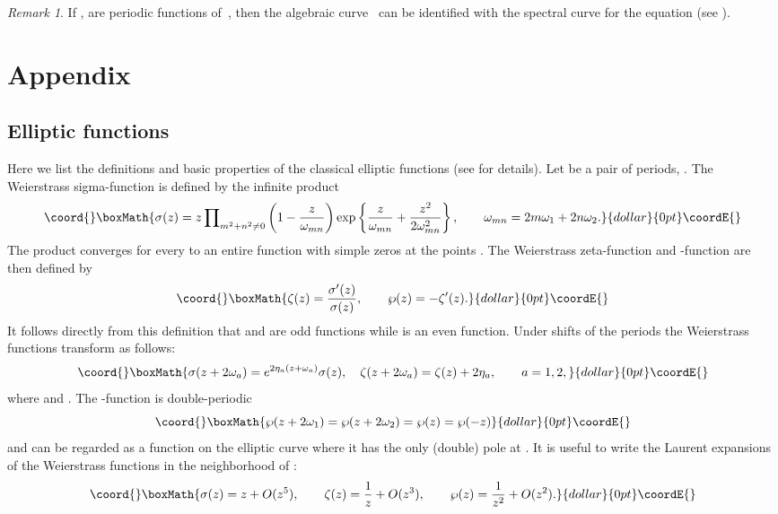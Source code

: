 \documentclass[a4paper,11pt]{article}
\providecommand{\p}{\partial}
\providecommand{\comp}{\mathbb C}
\providecommand{\inte}{\mathbb Z}
\providecommand{\vS}{\Vec{S}}
\theoremstyle{plain}
\theoremstyle{remark}
\newtheorem*{rem}{Remark}
\begin{document}
\begin{rem}
If \coordHE{}, \coordHE{} are periodic functions of~\coordHE{},
then the algebraic curve~\myHighlight{$\Gamma$}\coordHE{} can be identified with the spectral
curve for the equation \myHighlight{$(\p_x- L)\vS=0$}\coordHE{} (see \cite{krvb}).
\end{rem}

\appendix
\section{Appendix}
\subsection{Elliptic functions}

Here we list the definitions and basic properties of the classical
elliptic functions (see \cite{bat} for details).
Let \myHighlight{$2\omega_1,2\omega_2\in\comp$}\coordHE{}
be a pair of periods, \coordHE{}.
The Weierstrass sigma-function is defined by the infinite product
$$\coord{}\boxMath{
\sigma(z)= z \prod\nolimits_{m^2+n^2\ne 0} \left( 1-\frac{z}{\omega_{m n}}
\right)
\exp\left\{ \frac{z}{\omega_{m n}}+\frac{z^2}{2 \omega^2_{m n}} \right\},
\qquad
\omega_{m n}=2m \omega_1+2n \omega_2 .
}{dollar}{0pt}\coordE{}$$
The product converges for every \coordHE{} to an entire function with simple
zeros at the points \coordHE{}.
The Weierstrass zeta-function and \myHighlight{$\wp$}\coordHE{}-function are then defined by
$$\coord{}\boxMath{
\zeta(z)=\frac{\sigma'(z)}{\sigma(z)},\qquad
\wp(z)=-\zeta'(z) .
}{dollar}{0pt}\coordE{}$$
It follows directly from this definition that \coordHE{} and \coordHE{}
are odd functions while \coordHE{} is an even function. Under shifts
of the periods the Weierstrass functions transform as follows:
$$\coord{}\boxMath{
\sigma(z+2\omega_a)=e^{2\eta_a(z+\omega_a)}\sigma(z),\quad
\zeta(z+2\omega_a)=\zeta(z)+2\eta_a,\qquad a=1,2,
}{dollar}{0pt}\coordE{}$$
where \coordHE{} and \coordHE{}.
The \myHighlight{$\wp$}\coordHE{}-function is double-periodic
$$\coord{}\boxMath{
\wp(z+2\omega_1)=\wp(z+2\omega_2)=\wp(z)=\wp(-z)
}{dollar}{0pt}\coordE{}$$
and can be regarded as a function on the elliptic curve
\myHighlight{$\Gamma=\comp \bigl/ \inte[2\omega_1,2\omega_2] \bigr.$}\coordHE{}
where it has the only (double) pole at \coordHE{}.
It is useful to write the Laurent expansions of the Weierstrass
functions in the neighborhood of \coordHE{}:
$$\coord{}\boxMath{
\sigma(z)=z+O(z^5),\qquad \zeta(z)=\frac{1}{z}+O(z^3),\qquad
\wp(z)=\frac{1}{z^2}+O(z^2) .
}{dollar}{0pt}\coordE{}$$
\end{document}
